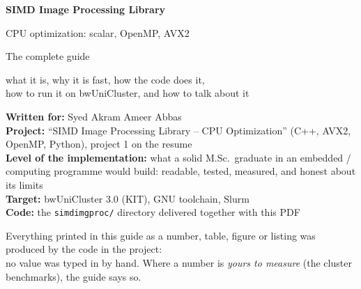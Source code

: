 \documentclass[11pt,a4paper]{report}
\DeclareRobustCommand{\_}{\textunderscore\allowbreak{}}
\newcommand{\file}[1]{\texttt{#1}}
\begin{document}
\begin{titlepage}
\centering
\vspace*{2.2cm}
{\Huge\bfseries\color{accent} SIMD Image Processing Library\par}
\vspace{0.3cm}
{\LARGE CPU optimization: scalar, OpenMP, AVX2\par}
\vspace{0.4cm}
{\LARGE The complete guide\par}
\vspace{0.8cm}
{\large what it is, why it is fast, how the code does it,\\ how to run it on bwUniCluster, and how to talk about it\par}
\vspace{1.4cm}
\begin{tcolorbox}[colback=plainbg,colframe=accent,width=0.82\textwidth,boxrule=0.5pt]
\raggedright
\textbf{Written for:} Syed Akram Ameer Abbas\\
\textbf{Project:} ``SIMD Image Processing Library -- CPU Optimization'' (C++, AVX2, OpenMP, Python), project 1 on the resume\\
\textbf{Level of the implementation:} what a solid M.Sc.\ graduate in an embedded / computing programme would build: readable, tested, measured, and honest about its limits\\
\textbf{Target:} bwUniCluster 3.0 (KIT), GNU toolchain, Slurm\\
\textbf{Code:} the \file{simd\_imgproc/} directory delivered together with this PDF
\end{tcolorbox}
\vfill
{\small Everything printed in this guide as a number, table, figure or listing was produced by the code in the project:\\
no value was typed in by hand. Where a number is \emph{yours to measure} (the cluster benchmarks), the guide says so.\par}
\end{titlepage}

\tableofcontents



















\appendix

\end{document}
